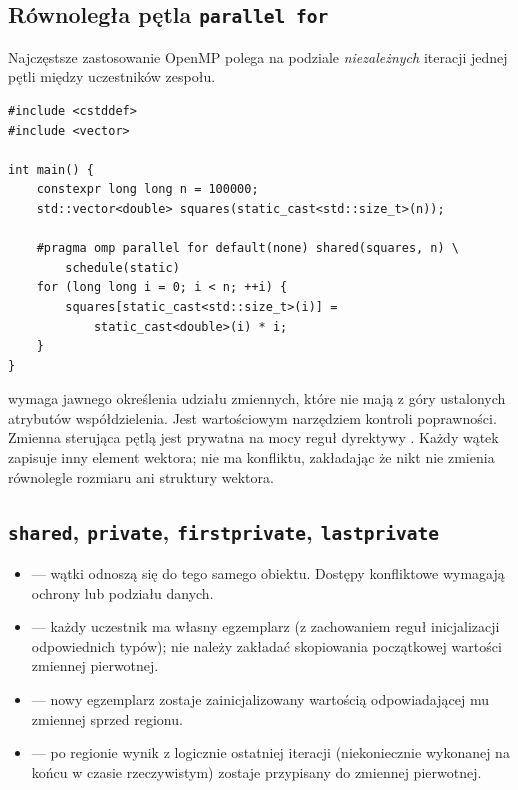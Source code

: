 \subsection{Równoległa pętla \texttt{parallel for}}

Najczęstsze zastosowanie OpenMP polega na podziale \emph{niezależnych}
iteracji jednej pętli między uczestników zespołu.

\begin{lstlisting}[caption={Wypełnianie wektora: niezależne iteracje.}]
#include <cstddef>
#include <vector>

int main() {
    constexpr long long n = 100000;
    std::vector<double> squares(static_cast<std::size_t>(n));

    #pragma omp parallel for default(none) shared(squares, n) \
        schedule(static)
    for (long long i = 0; i < n; ++i) {
        squares[static_cast<std::size_t>(i)] =
            static_cast<double>(i) * i;
    }
}
\end{lstlisting}

 wymaga jawnego określenia udziału zmiennych,
które nie mają z góry ustalonych atrybutów współdzielenia. Jest
wartościowym narzędziem kontroli poprawności. Zmienna sterująca
pętlą  jest prywatna na mocy reguł dyrektywy .
Każdy wątek zapisuje inny element wektora; nie ma konfliktu,
zakładając że nikt nie zmienia równolegle rozmiaru ani struktury wektora.

\subsection{\texttt{shared}, \texttt{private}, \texttt{firstprivate}, \texttt{lastprivate}}

\begin{itemize}
\item {} --- wątki odnoszą się do tego samego obiektu.
Dostępy konfliktowe wymagają ochrony lub podziału danych.
\item {} --- każdy uczestnik ma własny egzemplarz
(z zachowaniem reguł inicjalizacji odpowiednich typów);
nie należy zakładać skopiowania początkowej wartości zmiennej pierwotnej.
\item \code{firstprivate(x)} --- nowy egzemplarz zostaje zainicjalizowany
wartością odpowiadającej mu zmiennej sprzed regionu.
\item {} --- po regionie wynik z logicznie ostatniej
iteracji (niekoniecznie wykonanej na końcu w czasie rzeczywistym)
zostaje przypisany do zmiennej pierwotnej.
\end{itemize}

